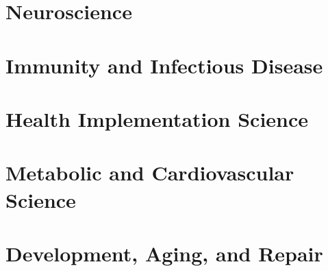 \documentclass[11pt, final]{article}
\begin{document}
	\part{Neuroscience}
	\HRule
%	
%	
%	
%	
	
%	
%	
%	
%	
	
	
	\clearpage
	\part{Immunity and Infectious Disease}
	\HRule
%	
%	
%	
%	
	
%	
%	
%	
%	
	
	
	\clearpage
	\part{Health Implementation Science}
	\HRule
%	
%	
%	
%	
	
%	
%	
%	
%	
	
	
	\clearpage
	\part{Metabolic and Cardiovascular Science}
	\HRule
%	
%	
%	
%	
	
%	
%	
%	
%	
	
	
	\clearpage
	\part{Development, Aging, and Repair}
	\HRule
%	
%	
%	
%	
	
%	
%	
%	
%	

	\clearpage
	\nocite{*}
	
	

	\printindex
\end{document}
